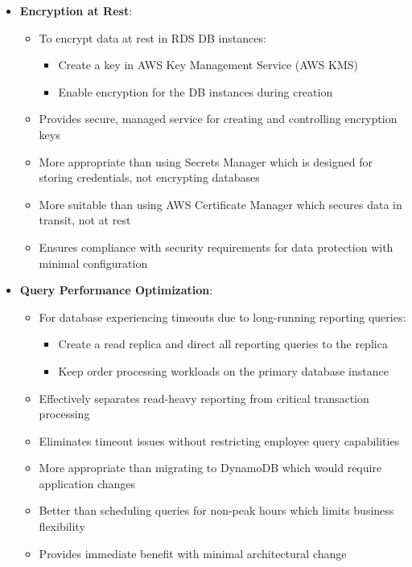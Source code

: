 \documentclass[11pt,a4paper]{report}
\begin{document}
\begin{itemize}
\begin{itemize}
  \item Retains all database configuration settings and data in a consistent state
  \item Can be automated with AWS Backup for regular cross-account replication
\end{itemize}
  \item \textbf{Encryption at Rest}:
\begin{itemize}
  \item To encrypt data at rest in RDS DB instances:
\begin{itemize}
  \item Create a key in AWS Key Management Service (AWS KMS)
  \item Enable encryption for the DB instances during creation
\end{itemize}
  \item Provides secure, managed service for creating and controlling encryption keys
  \item More appropriate than using Secrets Manager which is designed for storing credentials, not encrypting databases
  \item More suitable than using AWS Certificate Manager which secures data in transit, not at rest
  \item Ensures compliance with security requirements for data protection with minimal configuration
\end{itemize}
  \item \textbf{Query Performance Optimization}:
\begin{itemize}
  \item For database experiencing timeouts due to long-running reporting queries:
\begin{itemize}
  \item Create a read replica and direct all reporting queries to the replica
  \item Keep order processing workloads on the primary database instance
\end{itemize}
  \item Effectively separates read-heavy reporting from critical transaction processing
  \item Eliminates timeout issues without restricting employee query capabilities
  \item More appropriate than migrating to DynamoDB which would require application changes
  \item Better than scheduling queries for non-peak hours which limits business flexibility
  \item Provides immediate benefit with minimal architectural change

\end{itemize}
\end{itemize}
\end{document}
